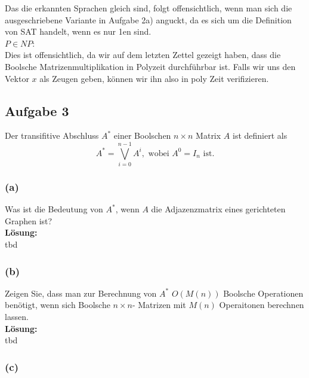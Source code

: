 \documentclass[11pt,a4paper,ngerman]{article}
\begin{document}
Das die erkannten Sprachen gleich sind, folgt offensichtlich, wenn man sich die ausgeschriebene Variante in Aufgabe 2a) anguckt,
da es sich um die Definition von SAT handelt, wenn es nur 1en sind.\\

$P \in NP$:\\
Dies ist offensichtlich, da wir auf dem letzten Zettel gezeigt haben, dass die Boolsche Matrizenmultiplikation in Polyzeit durchführbar ist.
Falls wir uns den Vektor $x$ als Zeugen geben, können wir ihn also in poly Zeit verifizieren.

\subsection*{Aufgabe 3}

Der transifitive Abschluss $A^*$ einer Boolschen $n \times n$ Matrix $A$ ist definiert als
\begin{equation*}
    A^* = \overset{n-1}{\underset{i=0}{\bigvee}} A^i,\text{ wobei }A^0 = I_n\text{ ist.}
\end{equation*}

\subsubsection*{(a)}
Was ist die Bedeutung von $A^*$, wenn $A$ die Adjazenzmatrix eines gerichteten Graphen ist?\\

\textbf{Lösung:}\\

tbd

\subsubsection*{(b)}

Zeigen Sie, dass man zur Berechnung von $A^*$ $O(M(n))$ Boolsche Operationen benötigt, wenn sich Boolsche $n \times n$- Matrizen mit $M(n)$ Operaitonen berechnen lassen.\\

\textbf{Lösung:}\\

tbd

\subsubsection*{(c)}
\end{document}
